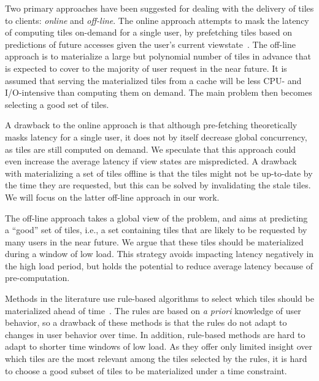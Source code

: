 \documentclass[11pt, oneside]{report}
\begin{document}
Two primary approaches have been suggested for dealing with the delivery of tiles to clients: \emph{online} and \emph{off-line}. The online approach attempts to mask the latency of computing tiles on-demand for a single user, by prefetching tiles based on predictions of future accesses given the user's current viewstate~\cite{KKK01:Prefetching,KKK01:Prefetching2,LKK+02:Prefetching}. The off-line approach is to materialize a large but polynomial number of tiles in advance that is expected to cover to the majority of user request in the near future. It is assumed that serving the materialized tiles from a cache will be less CPU- and I/O-intensive than computing them on demand. The main problem then becomes selecting a good set of tiles. 

A drawback to the online approach is that although pre-fetching theoretically masks latency for a single user, it does not by itself decrease global concurrency, as tiles are still computed on demand. We speculate that this approach could even increase the average latency if view states are mispredicted. A drawback with materializing a set of tiles offline is that the tiles might not be up-to-date by the time they are requested, but this can be solved by invalidating the stale tiles. We will focus on the latter off-line approach in our work.

The off-line approach takes a global view of the problem, and aims at predicting a ``good'' set of tiles, i.e., a set containing tiles that are likely to be requested by many users in the near future. We argue that these tiles should be materialized during a window of low load. This strategy avoids impacting latency negatively in the high load period, but holds the potential to reduce average latency because of pre-computation.

Methods in the literature use rule-based algorithms to select which tiles should be materialized ahead of time~\cite{quinn10}. The rules are based on \emph{a priori} knowledge of user behavior, so a drawback of these methods is that the rules do not adapt to changes in user behavior over time. In addition, rule-based methods are hard to adapt to shorter time windows of low load. As they offer only limited insight over which tiles are the most relevant among the tiles selected by the rules, it is hard to choose a good subset of tiles to be materialized under a time constraint.  
\end{document}
